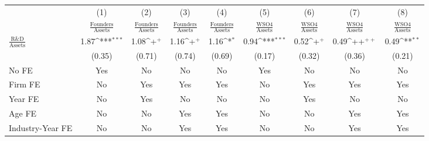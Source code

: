 {
\def\sym#1{\ifmmode^{#1}\else\(^{#1}\)\fi}
\begin{tabular}{l*{8}{c}}
\toprule
                    &\multicolumn{1}{c}{(1)}&\multicolumn{1}{c}{(2)}&\multicolumn{1}{c}{(3)}&\multicolumn{1}{c}{(4)}&\multicolumn{1}{c}{(5)}&\multicolumn{1}{c}{(6)}&\multicolumn{1}{c}{(7)}&\multicolumn{1}{c}{(8)}\\
                    &\multicolumn{1}{c}{$\frac{\textrm{Founders}}{\textrm{Assets}}$}&\multicolumn{1}{c}{$\frac{\textrm{Founders}}{\textrm{Assets}}$}&\multicolumn{1}{c}{$\frac{\textrm{Founders}}{\textrm{Assets}}$}&\multicolumn{1}{c}{$\frac{\textrm{Founders}}{\textrm{Assets}}$}&\multicolumn{1}{c}{$\frac{\textrm{WSO4}}{\textrm{Assets}}$}&\multicolumn{1}{c}{$\frac{\textrm{WSO4}}{\textrm{Assets}}$}&\multicolumn{1}{c}{$\frac{\textrm{WSO4}}{\textrm{Assets}}$}&\multicolumn{1}{c}{$\frac{\textrm{WSO4}}{\textrm{Assets}}$}\\
\midrule
$\frac{\textrm{R\&D}}{\textrm{Assets}}$&        1.87\sym{***}&        1.08\sym{+}  &        1.16\sym{+}  &        1.16\sym{*}  &        0.94\sym{***}&        0.52\sym{+}  &        0.49\sym{++} &        0.49\sym{**} \\
                    &      (0.35)         &      (0.71)         &      (0.74)         &      (0.69)         &      (0.17)         &      (0.32)         &      (0.36)         &      (0.21)         \\
\addlinespace
No FE               &         Yes         &          No         &          No         &          No         &         Yes         &          No         &          No         &          No         \\
\addlinespace
Firm FE             &          No         &         Yes         &         Yes         &         Yes         &          No         &         Yes         &         Yes         &         Yes         \\
\addlinespace
Year FE             &          No         &         Yes         &          No         &          No         &          No         &         Yes         &          No         &          No         \\
\addlinespace
Age FE              &          No         &          No         &         Yes         &         Yes         &          No         &          No         &         Yes         &         Yes         \\
\addlinespace
Industry-Year FE    &          No         &          No         &         Yes         &         Yes         &          No         &          No         &         Yes         &         Yes         \\

\end{tabular}}
